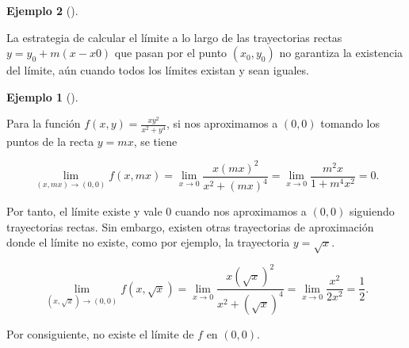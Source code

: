 \documentclass[
  a4paper,
]{scrreport}
\theoremstyle{definition}
\newtheorem{example}{Ejemplo}[chapter]
\theoremstyle{plain}
\theoremstyle{definition}
\theoremstyle{definition}
\theoremstyle{plain}
\theoremstyle{plain}
\theoremstyle{remark}
\begin{document}
\begin{example}[]
\begin{tcolorbox}[enhanced jigsaw, leftrule=.75mm, colbacktitle=quarto-callout-caution-color!10!white, toprule=.15mm, opacityback=0, opacitybacktitle=0.6, toptitle=1mm, breakable, bottomtitle=1mm, colframe=quarto-callout-caution-color-frame, rightrule=.15mm, titlerule=0mm, title=\textcolor{quarto-callout-caution-color}{\faFire}\hspace{0.5em}{Precaución}, arc=.35mm, left=2mm, bottomrule=.15mm, colback=white, coltitle=black]

La estrategia de calcular el límite a lo largo de las trayectorias
rectas \(y=y_0+m(x-x0)\) que pasan por el punto \((x_0,y_0)\) no
garantiza la existencia del límite, aún cuando todos los límites existan
y sean iguales.

\end{tcolorbox}

\begin{example}[]\protect\hypertarget{exm-no-existencia-limite-2}{}\label{exm-no-existencia-limite-2}

Para la función \(f(x,y)=\frac{xy^2}{x^2+y^4}\), si nos aproximamos a
\((0,0)\) tomando los puntos de la recta \(y=mx\), se tiene

\[
\lim_{(x,mx)\to(0,0)} f(x,mx) 
= \lim_{x\to 0} \frac{x(mx)^2}{x^2+(mx)^4}
= \lim_{x\to 0} \frac{m^2x}{1+m^4x^2}
= 0.
\]

Por tanto, el límite existe y vale \(0\) cuando nos aproximamos a
\((0,0)\) siguiendo trayectorias rectas. Sin embargo, existen otras
trayectorias de aproximación donde el límite no existe, como por
ejemplo, la trayectoria \(y = \sqrt{x}\).

\[
\lim_{(x,\sqrt{x})\to(0,0)} f(x,\sqrt{x}) 
= \lim_{x\to 0} \frac{x(\sqrt{x})^2}{x^2+(\sqrt{x})^4}
= \lim_{x\to 0} \frac{x^2}{2x^2}
= \frac{1}{2}.
\]

Por consiguiente, no existe el límite de \(f\) en \((0,0)\).

\begin{figure}

\end{figure}
\end{example}
\end{example}
\end{document}
